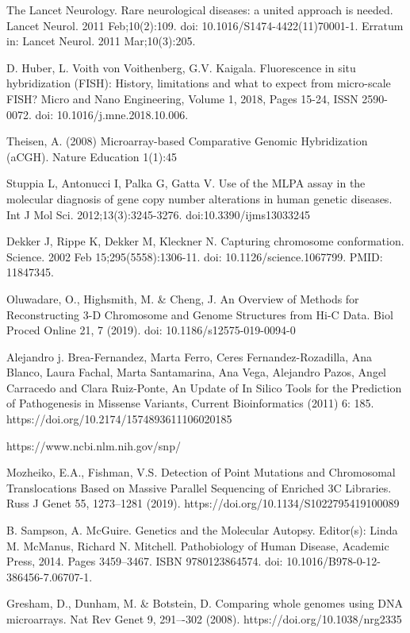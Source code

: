 \documentclass[a4paper,12pt]{article}
\begin{document}
\begin{thebibliography}{300}
The Lancet Neurology. Rare neurological diseases: a united approach is needed. Lancet Neurol. 2011 Feb;10(2):109. doi: 10.1016/S1474-4422(11)70001-1. Erratum in: Lancet Neurol. 2011 Mar;10(3):205.

D. Huber, L. Voith von Voithenberg, G.V. Kaigala. Fluorescence in situ hybridization (FISH): History, limitations and what to expect from micro-scale FISH? Micro and Nano Engineering, Volume 1, 2018, Pages 15-24, ISSN 2590-0072. doi: 10.1016/j.mne.2018.10.006.

Theisen, A. (2008) Microarray-based Comparative Genomic Hybridization (aCGH). Nature Education 1(1):45

Stuppia L, Antonucci I, Palka G, Gatta V. Use of the MLPA assay in the molecular diagnosis of gene copy number alterations in human genetic diseases. Int J Mol Sci. 2012;13(3):3245-3276. doi:10.3390/ijms13033245

Dekker J, Rippe K, Dekker M, Kleckner N. Capturing chromosome conformation. Science. 2002 Feb 15;295(5558):1306-11. doi: 10.1126/science.1067799. PMID: 11847345.

Oluwadare, O., Highsmith, M. \& Cheng, J. An Overview of Methods for Reconstructing 3-D Chromosome and Genome Structures from Hi-C Data. Biol Proced Online 21, 7 (2019). doi: 10.1186/s12575-019-0094-0

Alejandro j. Brea-Fernandez, Marta Ferro, Ceres Fernandez-Rozadilla, Ana Blanco, Laura Fachal, Marta Santamarina, Ana Vega, Alejandro Pazos, Angel Carracedo and Clara Ruiz-Ponte, An Update of In Silico Tools for the Prediction of Pathogenesis in Missense Variants, Current Bioinformatics (2011) 6: 185. https://doi.org/10.2174/1574893611106020185 

https://www.ncbi.nlm.nih.gov/snp/

Mozheiko, E.A., Fishman, V.S. Detection of Point Mutations and Chromosomal Translocations Based on Massive Parallel Sequencing of Enriched 3C Libraries. Russ J Genet 55, 1273–1281 (2019). https://doi.org/10.1134/S1022795419100089

B. Sampson, A. McGuire. Genetics and the Molecular Autopsy. Editor(s): Linda M. McManus, Richard N. Mitchell. Pathobiology of Human Disease, Academic Press, 2014. Pages 3459--3467. ISBN 9780123864574. doi: 10.1016/B978-0-12-386456-7.06707-1.

Gresham, D., Dunham, M. \& Botstein, D. Comparing whole genomes using DNA microarrays. Nat Rev Genet 9, 291–-302 (2008). https://doi.org/10.1038/nrg2335


\end{thebibliography}
\end{document}
